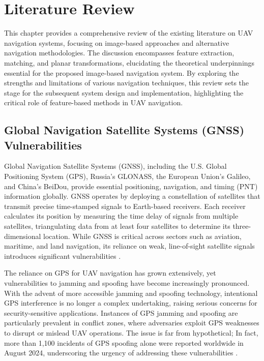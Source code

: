 
\chapter{Literature Review}


This chapter provides a comprehensive review of the existing literature on UAV navigation systems, focusing on image-based approaches and alternative navigation methodologies. The discussion encompasses feature extraction, matching, and planar transformations, elucidating the theoretical underpinnings essential for the proposed image-based navigation system. By exploring the strengths and limitations of various navigation techniques, this review sets the stage for the subsequent system design and implementation, highlighting the critical role of feature-based methods in UAV navigation.



\section{Global Navigation Satellite Systems (GNSS) Vulnerabilities}


Global Navigation Satellite Systems (GNSS), including the U.S. Global Positioning System (GPS), Russia's GLONASS, the European Union's Galileo, and China’s BeiDou, provide essential positioning, navigation, and timing (PNT) information globally. GNSS operates by deploying a constellation of satellites that transmit precise time-stamped signals to Earth-based receivers. Each receiver calculates its position by measuring the time delay of signals from multiple satellites, triangulating data from at least four satellites to determine its three-dimensional location. While GNSS is critical across sectors such as aviation, maritime, and land navigation, its reliance on weak, line-of-sight satellite signals introduces significant vulnerabilities \cite{geotab2024gps}.

The reliance on GPS for UAV navigation has grown extensively, yet vulnerabilities to jamming and spoofing have become increasingly pronounced. With the advent of more accessible jamming and spoofing technology, intentional GPS interference is no longer a complex undertaking, raising serious concerns for security-sensitive applications. Instances of GPS jamming and spoofing are particularly prevalent in conflict zones, where adversaries exploit GPS weaknesses to disrupt or mislead UAV operations. The issue is far from hypothetical; In fact, more than 1,100 incidents of GPS spoofing alone were reported worldwide in August 2024, underscoring the urgency of addressing these vulnerabilities \cite{khalil2024gnss}.

